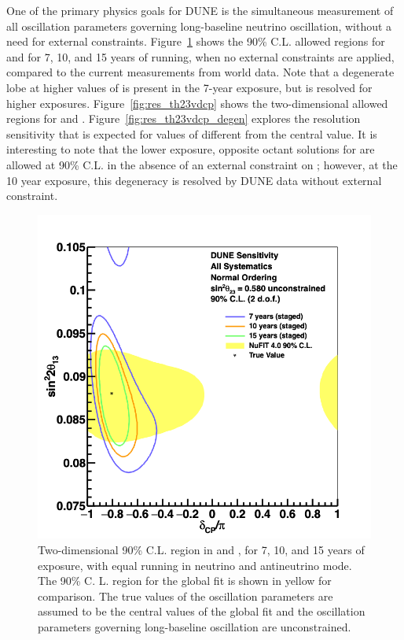 One of the primary physics goals for DUNE is the simultaneous measurement of all oscillation parameters governing long-baseline neutrino oscillation, without a need for external constraints. Figure~\ref{fig:res_th13vdcp} shows the 90\% C.L. allowed regions for  and \deltacp for 7, 10, and 15 years of running, when no external constraints are applied, compared to the current measurements from world data. Note that a degenerate lobe at higher values of  is present in the 7-year exposure, but is resolved for higher exposures. Figure~\ref{fig:res_th23vdcp} shows the two-dimensional allowed regions for  and \deltacp. Figure~\ref{fig:res_th23vdcp_degen} explores the resolution sensitivity that is expected for values of  different from the  central value. It is interesting to note that the lower exposure, opposite octant solutions for  are allowed at 90\% C.L. in the absence of an external constraint on ; however, at the 10 year exposure, this degeneracy is resolved by DUNE data without external constraint.

\begin{figure}[h!]
    \centering
		\includegraphics[width=0.95\linewidth]{graphics/bubbles_q13_2019_fulldisclosure.png}
	\caption[Two-dimensional 90\% C.L. region in  and \deltacp]{Two-dimensional 90\% C.L. region in  and \deltacp, for 7, 10, and 15 years of exposure, with equal running in neutrino and antineutrino mode. The 90\% C. L. region for the  global fit is shown in yellow for comparison. The true values of the oscillation parameters are assumed to be the central values of the  global fit and the oscillation parameters governing long-baseline oscillation are unconstrained.}
    \label{fig:res_th13vdcp}
\end{figure}

